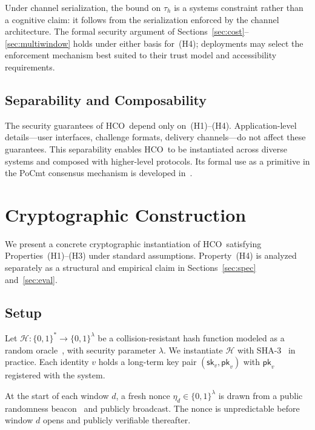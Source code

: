 \documentclass[11pt]{article}
\newcommand{\HCO}{HCO\xspace}
\theoremstyle{remark}
\theoremstyle{plain}
\begin{document}
	Under channel serialization, the bound on $\tau_h$ is a systems
	constraint rather than a cognitive claim: it follows from the
	serialization enforced by the channel architecture. The formal security
	argument of Sections~\ref{sec:cost}--\ref{sec:multiwindow} holds under
	either basis for~(H4); deployments may select the enforcement mechanism
	best suited to their trust model and accessibility requirements.
	
	\subsection{Separability and Composability}
	
	The security guarantees of \HCO\ depend only on~(H1)--(H4). Application-level
	details---user interfaces, challenge formats, delivery channels---do not affect
	these guarantees. This separability enables \HCO\ to be instantiated across
	diverse systems and composed with higher-level protocols. Its formal use as a
	primitive in the PoCmt consensus mechanism is developed
	in~\cite{maleki2026pocmt}.
	
	
	\section{Cryptographic Construction}
	\label{sec:construction}
	
	We present a concrete cryptographic instantiation of \HCO\ satisfying
	Properties~(H1)--(H3) under standard assumptions. Property~(H4)
	is analyzed separately as a structural and empirical claim in
	Sections~\ref{sec:spec} and~\ref{sec:eval}.
	
	\subsection{Setup}
	
	Let $\mathcal{H}: \{0,1\}^* \to \{0,1\}^\lambda$ be a collision-resistant
	hash function modeled as a random oracle~\cite{bellare1993random}, with
	security parameter $\lambda$. We instantiate $\mathcal{H}$ with
	SHA-3~\cite{nist2015sha3} in practice. Each identity $v$ holds a
	long-term key pair $(\mathsf{sk}_v, \mathsf{pk}_v)$ with $\mathsf{pk}_v$
	registered with the system.
	
	At the start of each window $d$, a fresh nonce
	$\eta_d \in \{0,1\}^\lambda$ is drawn from a public randomness
	beacon~\cite{syta2017drand} and publicly broadcast. The nonce is
	unpredictable before window $d$ opens and publicly verifiable thereafter.
	
\end{document}
